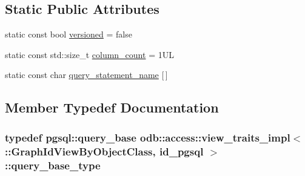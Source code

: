 \subsection*{Static Public Attributes}
\begin{DoxyCompactItemize}
\item 
static const bool \hyperlink{classodb_1_1access_1_1view__traits__impl_3_01_1_1_graph_id_view_by_object_class_00_01id__pgsql_01_4_a9bb9a2ac3e9b26427cdd47baa3f3dc46}{versioned} = false
\item 
static const std\+::size\+\_\+t \hyperlink{classodb_1_1access_1_1view__traits__impl_3_01_1_1_graph_id_view_by_object_class_00_01id__pgsql_01_4_ae8374e9c22533fb41ec00a50e4d5fc58}{column\+\_\+count} = 1\+U\+L
\item 
static const char \hyperlink{classodb_1_1access_1_1view__traits__impl_3_01_1_1_graph_id_view_by_object_class_00_01id__pgsql_01_4_a3c8a3aebd0d48dce559852115085f16a}{query\+\_\+statement\+\_\+name} \mbox{[}$\,$\mbox{]}
\end{DoxyCompactItemize}


\subsection{Member Typedef Documentation}
\hypertarget{classodb_1_1access_1_1view__traits__impl_3_01_1_1_graph_id_view_by_object_class_00_01id__pgsql_01_4_a1396a7bdbbd8fed65dd070b1579e2822}{}
\subsubsection[{query\+\_\+base\+\_\+type}]{\setlength{\rightskip}{0pt plus 5cm}typedef pgsql\+::query\+\_\+base odb\+::access\+::view\+\_\+traits\+\_\+impl$<$ \+::{\bf Graph\+Id\+View\+By\+Object\+Class}, id\+\_\+pgsql $>$\+::{\bf query\+\_\+base\+\_\+type}}\label{classodb_1_1access_1_1view__traits__impl_3_01_1_1_graph_id_view_by_object_class_00_01id__pgsql_01_4_a1396a7bdbbd8fed65dd070b1579e2822}
\hypertarget{classodb_1_1access_1_1view__traits__impl_3_01_1_1_graph_id_view_by_object_class_00_01id__pgsql_01_4_a7dc1c9dff4f83109295ec06e0d29e527}{}
